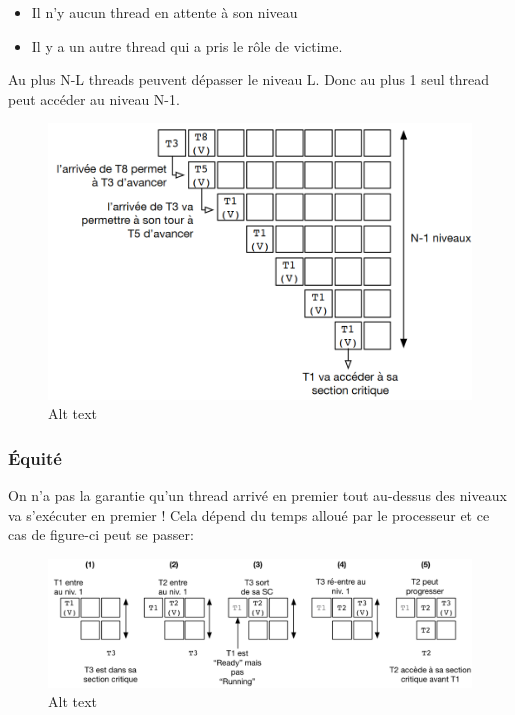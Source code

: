 \begin{itemize}
\tightlist
\item
  Il n'y aucun thread en attente à son niveau
\item
  Il y a un autre thread qui a pris le rôle de victime.
\end{itemize}

Au plus N-L threads peuvent dépasser le niveau L. Donc au plus 1 seul
thread peut accéder au niveau N-1.

\begin{figure}
\centering
\includegraphics{image-26.png}
\caption{Alt text}
\end{figure}

\subsubsection{Équité}\label{uxe9quituxe9}

On n'a pas la garantie qu'un thread arrivé en premier tout au-dessus des
niveaux va s'exécuter en premier ! Cela dépend du temps alloué par le
processeur et ce cas de figure-ci peut se passer:

\begin{figure}
\centering
\includegraphics{image-27.png}
\caption{Alt text}
\end{figure}

